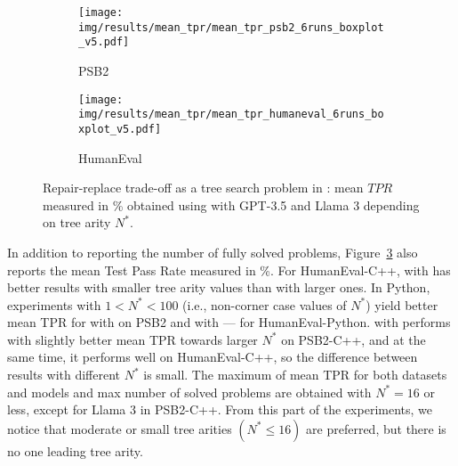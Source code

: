 \begin{figure}[bt]
\begin{subfigure}{\linewidth}
\centering
\texttt{[image: img/results/mean\_tpr/mean\_tpr\_psb2\_6runs\_boxplot\_v5.pdf]}
  \caption{PSB2}
  \label{fig:mean-tpr-psb2-gpt3.5}
\end{subfigure}
\begin{subfigure}{\columnwidth}
\centering
\texttt{[image: img/results/mean\_tpr/mean\_tpr\_humaneval\_6runs\_boxplot\_v5.pdf]}
  \caption{HumanEval}
  \label{fig:mean-tpr-he-gpt3.5}
\end{subfigure}
\caption{Repair-replace trade-off as a tree search problem in \method{}: mean $TPR$ measured in \% obtained using \method{} with GPT-3.5 and Llama 3 depending on tree arity $N^*$.}
\label{fig:mean-tpr-repair-replace-trade-off-generalizability}
\end{figure}


In addition to reporting the number of fully solved problems, Figure~\ref{fig:mean-tpr-repair-replace-trade-off-generalizability} also reports the mean Test Pass Rate measured in \%. 
For HumanEval-C++, \method{} with \gpt{} has better results with smaller tree arity values than with larger ones.
In Python, experiments with $1 < N^* < 100$ (i.e., non-corner case values of $N^*$) yield better mean TPR for \method{} with \gpt{} on PSB2 and with \llama{} --- for HumanEval-Python.
\method{} with \llama{} performs with slightly better mean TPR towards larger $N^*$  on PSB2-C++, and at the same time, it performs well on HumanEval-C++, so the difference between results with different $N^*$ is small.
The maximum of mean TPR for both datasets and models and max number of solved problems are obtained with $N^*=16$ or less, except for Llama 3 in PSB2-C++. 
From this part of the experiments, we notice that moderate or small tree arities $(N^* \le 16)$ are preferred, but there is no one leading tree arity.


